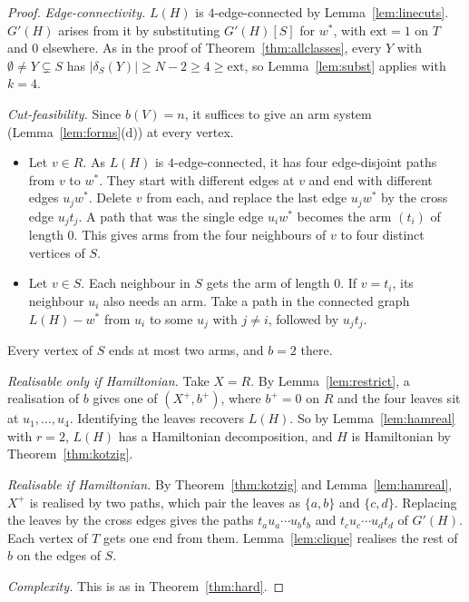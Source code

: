 \documentclass[11pt]{amsart}
\theoremstyle{definition}
\begin{document}
\begin{proof}
\emph{Edge-connectivity.} $L(H)$ is $4$-edge-connected by Lemma~\ref{lem:linecuts}. $G'(H)$ arises
from it by substituting $G'(H)[S]$ for $w^*$, with $\mathrm{ext}=1$ on $T$ and $0$ elsewhere. As in
the proof of Theorem~\ref{thm:allclasses}, every $Y$ with $\emptyset\ne Y\subsetneq S$ has
$|\delta_S(Y)|\ge N-2\ge4\ge\mathrm{ext}$, so Lemma~\ref{lem:subst} applies with $k=4$.

\emph{Cut-feasibility.} Since $b(V)=n$, it suffices to give an arm system
(Lemma~\ref{lem:forms}(d)) at every vertex.
\begin{itemize}
\item Let $v\in R$. As $L(H)$ is $4$-edge-connected, it has four edge-disjoint paths from $v$ to
$w^*$. They start with different edges at $v$ and end with different edges $u_jw^*$. Delete $v$
from each, and replace the last edge $u_jw^*$ by the cross edge $u_jt_j$. A path that was the single
edge $u_iw^*$ becomes the arm $(t_i)$ of length $0$. This gives arms from the four neighbours of $v$
to four distinct vertices of $S$.
\item Let $v\in S$. Each neighbour in $S$ gets the arm of length $0$. If $v=t_i$, its neighbour $u_i$
also needs an arm. Take a path in the connected graph $L(H)-w^*$ from $u_i$ to some $u_j$ with
$j\ne i$, followed by $u_jt_j$.
\end{itemize}
Every vertex of $S$ ends at most two arms, and $b=2$ there.

\emph{Realisable only if Hamiltonian.} Take $X=R$. By Lemma~\ref{lem:restrict}, a realisation of $b$
gives one of $(X^+,b^+)$, where $b^+=0$ on $R$ and the four leaves sit at $u_1,\dots,u_4$.
Identifying the leaves recovers $L(H)$. So by Lemma~\ref{lem:hamreal} with $r=2$, $L(H)$ has a
Hamiltonian decomposition, and $H$ is Hamiltonian by Theorem~\ref{thm:kotzig}.

\emph{Realisable if Hamiltonian.} By Theorem~\ref{thm:kotzig} and Lemma~\ref{lem:hamreal}, $X^+$
is realised by two paths, which pair the leaves as $\{a,b\}$ and $\{c,d\}$. Replacing the leaves by
the cross edges gives the paths $t_au_a\cdots u_bt_b$ and $t_cu_c\cdots u_dt_d$ of $G'(H)$. Each
vertex of $T$ gets one end from them. Lemma~\ref{lem:clique} realises the rest of $b$ on the edges of
$S$.

\emph{Complexity.} This is as in Theorem~\ref{thm:hard}.
\end{proof}
\end{document}
